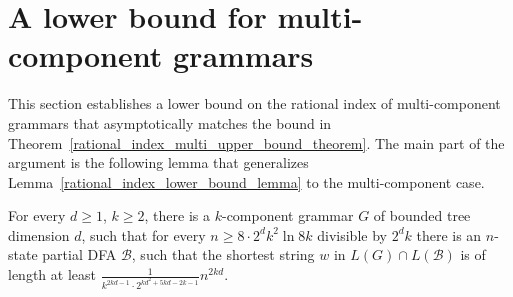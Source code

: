 \documentclass[runningheads]{llncs}
\begin{document}
\section{A lower bound for multi-component grammars}\label{section_multi_lower_bound}

This section establishes
a lower bound on the rational index of multi-component grammars
that asymptotically matches the bound in Theorem~\ref{rational_index_multi_upper_bound_theorem}.
The main part of the argument is the following lemma
that generalizes Lemma~\ref{rational_index_lower_bound_lemma} to the multi-component case.

\begin{lemma}\label{rational_index_multi_lower_bound_lemma}
For every $d \geqslant 1$, $k \geqslant 2$,
there is a $k$-component grammar $G$ of bounded tree dimension $d$,
such that for every $n \geqslant 8 \cdot 2^d k^2 \ln 8k$ divisible by $2^dk$
there is an $n$-state partial DFA $\mathcal{B}$,
such that the shortest string $w$ in $L(G) \cap L(\mathcal{B})$
is of length at least $\frac{1}{k^{2kd-1} \cdot 2^{kd^2 + 5kd -2k -1}} n^{2kd}$.
\end{lemma}
\end{document}
